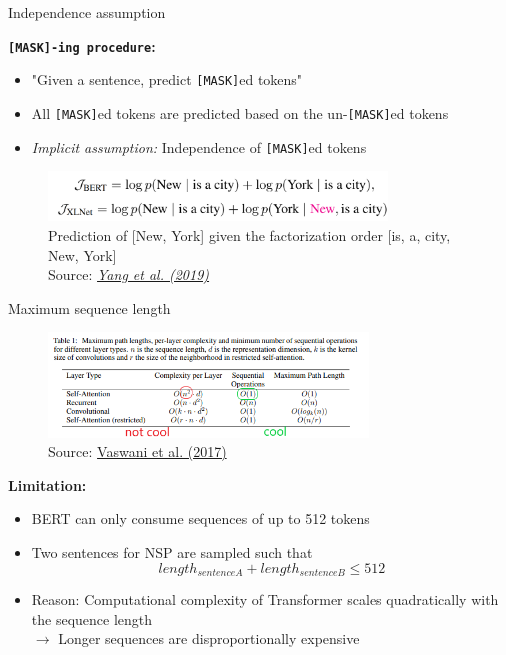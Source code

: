 \begin{frame}{Independence assumption}

\vspace{1.5cm}

\textbf{\texttt{[MASK]-ing procedure}:}

\begin{itemize}
	\item "Given a sentence, predict \texttt{[MASK]}ed tokens"
	\item All \texttt{[MASK]}ed tokens are predicted based on the un-\texttt{[MASK]}ed tokens
	\item \textit{Implicit assumption:} Independence of \texttt{[MASK]}ed tokens
\end{itemize}

	\begin{figure}
		\centering
		\includegraphics[width = 9cm]{figure/xlnet-objective}\\ 
		{\tiny Prediction of [New, York] given the factorization order [is, a, city, New, York]\\\footnotesize Source: \href{https://papers.nips.cc/paper/8812-xlnet-generalized-autoregressive-pretraining-for-language-understanding.pdf} \it Yang et al. (2019)}
	\end{figure}
	
\end{frame}


\begin{frame}{Maximum sequence length}

\begin{figure}
\centering
\includegraphics[width = 8.5cm]{figure/bert-problem.png}\\ 
\footnotesize{Source:} \href{https://arxiv.org/pdf/1706.03762.pdf}{\footnotesize Vaswani et al. (2017)}
\end{figure}

\textbf{Limitation:}

\begin{itemize}
	\item BERT can only consume sequences of up to 512 tokens
	\item Two sentences for NSP are sampled such that $$length_{sentence A} + length_{sentence B} \leq 512$$
	\item Reason: Computational complexity of Transformer scales quadratically with the sequence length\\
				$\rightarrow$ Longer sequences are disproportionally expensive
\end{itemize}

\end{frame}

